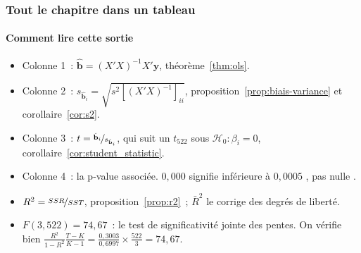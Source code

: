 \documentclass[10pt]{beamer}
\begin{document}
\begin{frame}
  \frametitle{Tout le chapitre dans un tableau}
  \framesubtitle{Comment lire cette sortie}

  \begin{itemize}

  \item Colonne 1~: $\hat{\mathbf b} = (X'X)^{-1}X'\mathbf y$, théorème~\ref{thm:ols}.\newline

  \item Colonne 2~: $s_{\hat{\mathbf b}_i} = \sqrt{s^2\left[ (X'X)^{-1} \right]_{ii}}$,
    proposition~\ref{prop:biais-variance} et corollaire~\ref{cor:s2}.\newline

  \item Colonne 3~: $t = \nicefrac{\hat{\mathbf b}_i}{s_{\hat{\mathbf b}_i}}$, qui suit
    un $t_{522}$ sous $\mathcal H_0:\beta_i=0$, corollaire~\ref{cor:student_statistic}.\newline

  \item Colonne 4~: la p-value associée. \guillemotleft $0{,}000$ \guillemotright{}
    signifie \guillemotleft inférieure à $0{,}0005$ \guillemotright, pas
    \guillemotleft nulle \guillemotright.\newline

  \item $R^2 = \nicefrac{SSR}{SST}$, proposition~\ref{prop:r2}~; $\bar R^2$ le corrige
    des degrés de liberté.\newline

  \item $F(3,522) = 74{,}67$~: le test de significativité jointe des pentes. On vérifie
    bien $\frac{R^2}{1-R^2}\frac{T-K}{K-1} = \frac{0{,}3003}{0{,}6997}\times\frac{522}{3} = 74{,}67$.

  \end{itemize}

\end{frame}
\end{document}
